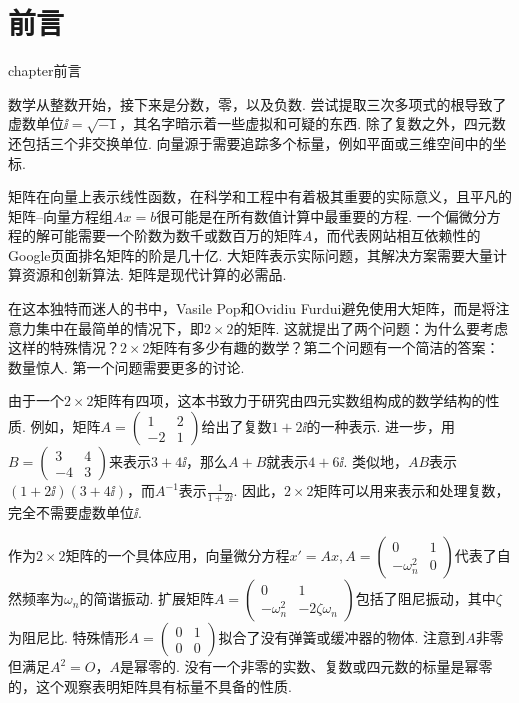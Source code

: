 

\chapter*{前言}
 {chapter}{前言}

数学从整数开始，接下来是分数，零，以及负数. 尝试提取三次多项式的根导致了虚数单位$\ii=\sqrt{-1}$，其名字暗示着一些虚拟和可疑的东西.
除了复数之外，四元数还包括三个非交换单位. 向量源于需要追踪多个标量，例如平面或三维空间中的坐标.

矩阵在向量上表示线性函数，在科学和工程中有着极其重要的实际意义，且平凡的矩阵{--}向量方程组$Ax=b$很可能是在所有数值计算中最重要的方程. 一个偏微分方程的解可能需要一个阶数为数千或数百万的矩阵$A$，而代表网站相互依赖性的Google页面排名矩阵的阶是几十亿. 大矩阵表示实际问题，其解决方案需要大量计算资源和创新算法. 矩阵是现代计算的必需品.

在这本独特而迷人的书中，Vasile Pop和Ovidiu Furdui避免使用大矩阵，而是将注意力集中在最简单的情况下，即$2\times2$的矩阵. 这就提出了两个问题：为什么要考虑这样的特殊情况？$2\times2$矩阵有多少有趣的数学？第二个问题有一个简洁的答案：数量惊人. 第一个问题需要更多的讨论.

由于一个$2\times2$矩阵有四项，这本书致力于研究由四元实数组构成的数学结构的性质. 例如，矩阵$A=\begin{pmatrix}
  1 & 2 \\-2 & 1
\end{pmatrix}$给出了复数$1+2\ii$的一种表示. 进一步，用$B=\begin{pmatrix}
  3 & 4 \\-4 & 3
\end{pmatrix}$来表示$3+4\ii$，那么$A+B$就表示$4+6\ii$. 类似地，$AB$表示$(1+2\ii)(3+4\ii)$，而$A^{-1}$表示$\frac1{1+2\ii}$. 因此，$2\times2$矩阵可以用来表示和处理复数，完全不需要虚数单位$\ii$.

作为$2\times2$矩阵的一个具体应用，向量微分方程$x'=Ax,A=\begin{pmatrix}
  0 & 1 \\ - \omega_n^2 & 0
\end{pmatrix}$代表了自然频率为$\omega_n$的简谐振动. 扩展矩阵$A=\begin{pmatrix}
  0 & 1 \\ -\omega_n^2 & -2\zeta\omega_n
\end{pmatrix}$包括了阻尼振动，其中$\zeta$为阻尼比. 特殊情形$A=\begin{pmatrix}
  0 & 1 \\ 0 & 0
\end{pmatrix}$拟合了没有弹簧或缓冲器的物体. 注意到$A$非零但满足$A^2=O$，$A$是幂零的. 没有一个非零的实数、复数或四元数的标量是幂零的，这个观察表明矩阵具有标量不具备的性质.

